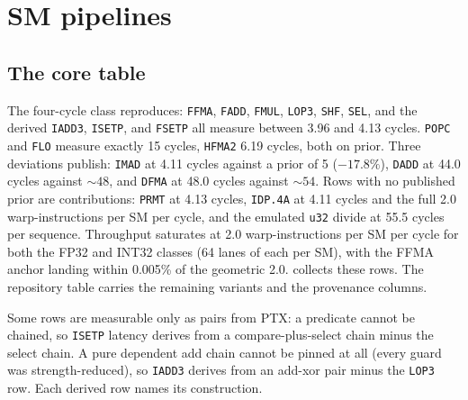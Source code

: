 \section{SM pipelines}
\label{sec:sm}

\subsection{The core table}

The four-cycle class \citep[tab.~4.1]{jia2019turing} reproduces:
\texttt{FFMA}, \texttt{FADD}, \texttt{FMUL}, \texttt{LOP3}, \texttt{SHF},
\texttt{SEL}, and the derived \texttt{IADD3}, \texttt{ISETP}, and
\texttt{FSETP} all measure between 3.96 and 4.13 cycles. \texttt{POPC}
and \texttt{FLO} measure exactly 15 cycles, \texttt{HFMA2} 6.19 cycles,
both on prior.
Three deviations publish: \texttt{IMAD} at 4.11 cycles against a prior of
5 ($-17.8\%$), \texttt{DADD} at 44.0 cycles against ${\sim}48$, and
\texttt{DFMA} at 48.0 cycles against ${\sim}54$. Rows with no published prior
are contributions: \texttt{PRMT} at 4.13 cycles, \texttt{IDP.4A} at 4.11
cycles and the full 2.0 warp-instructions per SM per cycle, and the
emulated \texttt{u32} divide at 55.5 cycles per sequence. Throughput
saturates at 2.0 warp-instructions per SM per cycle for both the FP32 and
INT32 classes (64 lanes of each per SM), with the FFMA anchor
landing within 0.005\% of the geometric 2.0.  collects
these rows. The repository table carries the remaining variants and the
provenance columns.

\begin{table}[t]
\centering
\caption{Core instruction rows. Latency by dependent \texttt{clock64}
chain, throughput at the peak of the warps-per-SM sweep, pipe bindings by
contention probe (\cref{sec:methodology}). The pipe \emph{own} denotes a
dedicated unit; wi/SM/clk abbreviates warp-instructions per SM per
cycle. Starred rows derive from pair constructions. Latency priors from
Jia et al.\ \citep{jia2019turing}.}
\label{tab:core}
\small

\end{table}

Some rows are measurable only as pairs from PTX: a predicate cannot be
chained, so \texttt{ISETP} latency derives from a compare-plus-select
chain minus the select chain. A pure dependent add chain cannot be
pinned at all (every guard was strength-reduced), so \texttt{IADD3}
derives from an add-xor pair minus the \texttt{LOP3} row. Each derived
row names its construction.

